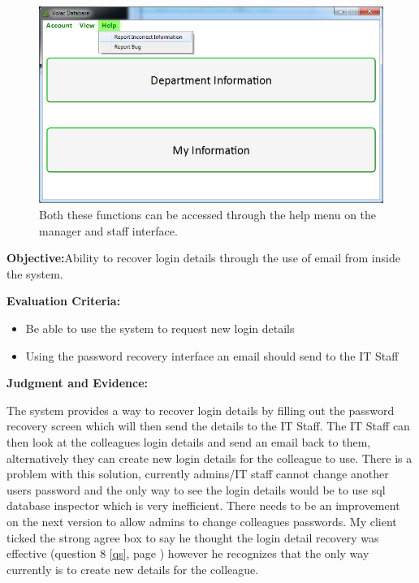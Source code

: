 \begin{figure}[H]
    \includegraphics[width=\textwidth]{./Testing/Images/HelpMenu.png}
    \caption{Both these functions can be accessed through the help menu on the manager and staff interface.} 
\end{figure}

\textbf{Objective:}Ability to recover login details through the use of email from inside the system.

\textbf{Evaluation Criteria:}
\begin{itemize}
\item{Be able to use the system to request new login details}
\item{Using the password recovery interface an email should send to the IT Staff}
\end{itemize}

\textbf{Judgment and Evidence:}

The system provides a way to recover login details by filling out the password recovery screen which will then send the details to the IT Staff. The IT Staff can then look at the colleagues login details and send an email back to them, alternatively they can create new login details for the colleague to use. There is a problem with this solution, currently admins/IT staff cannot change another users password and the only way to see the login details would be to use sql database inspector which is very inefficient. There needs to be an improvement on the next version to allow admins to change colleagues passwords. My client ticked the strong agree box to say he thought the login detail recovery was effective (question 8 \ref{qs}, page \pageref{qs}) however he recognizes that the only way currently is to create new details for the colleague.

